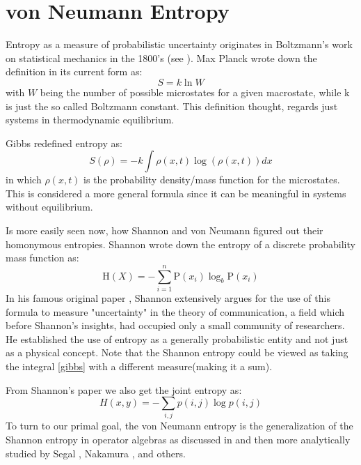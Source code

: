 \section{von Neumann Entropy}
\label{vonNeumannEntropysec}
\par
Entropy as a measure of probabilistic uncertainty originates in Boltzmann's work on statistical mechanics in the 1800's (see \cite{sharp2015translation}). Max Planck wrote down the definition in its current form as:
\begin{equation}
S=k \ln W
\end{equation}
with $W$ being the number of possible microstates for a given macrostate, while k is just the so called Boltzmann constant. This definition thought, regards just systems in thermodynamic equilibrium. 
\par
Gibbs redefined entropy as:
\begin{equation}
S(\rho)=-k \int \rho(x, t) \log (\rho(x, t)) d x
\label{gibbs}
\end{equation}
in which $\rho(x,t)$ is the probability density/mass function for the microstates. This is considered a more general formula since it can be meaningful in systems without equilibrium.
\par 
Is more easily seen now, how Shannon and von Neumann figured out their homonymous entropies. Shannon wrote down the entropy of a discrete probability mass function as:
\begin{equation}
\mathrm{H}(X)=-\sum_{i=1}^{n} \mathrm{P}\left(x_{i}\right) \log _{b} \mathrm{P}\left(x_{i}\right)
\label{shanon}
\end{equation}
In his famous original paper \cite{shannon1948mathematical}, Shannon extensively argues for the use of this formula to measure "uncertainty" in the theory of communication, a field which before Shannon's insights, had occupied only a small community of researchers. He established the use of entropy as a generally probabilistic entity and not just as a physical concept. Note that the Shannon entropy could be viewed as taking the integral \eqref{gibbs} with a different measure(making it a sum).
\par
From Shannon's paper we also get the joint entropy as:
\begin{equation}
H(x, y)=-\sum_{i, j} p(i, j) \log p(i, j)
\end{equation}
To turn to our primal goal, the von Neumann entropy is the generalization of the Shannon entropy in operator algebras as discussed in \cite{von2018mathematical} and then more analytically studied by Segal \citep{segal1960note}, Nakamura \citep{nakamura1961note}, and others. 
